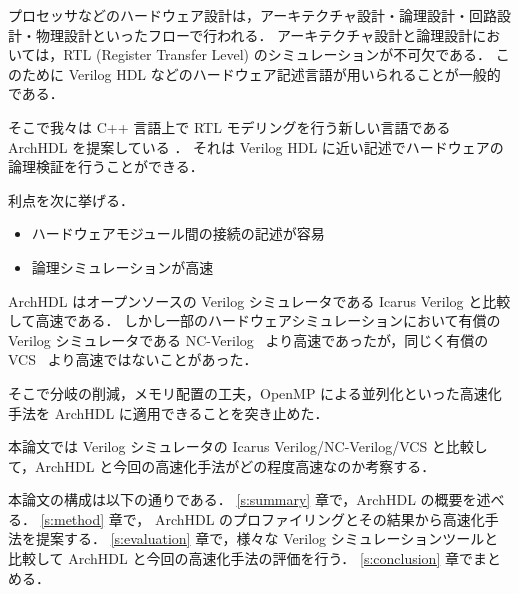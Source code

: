 プロセッサなどのハードウェア設計は，アーキテクチャ設計・論理設計・回路設計・物理設計といったフローで行われる．
アーキテクチャ設計と論理設計においては，RTL (Register Transfer Level) のシミュレーションが不可欠である．
このために Verilog HDL などのハードウェア記述言語が用いられることが一般的である．

そこで我々は C++ 言語上で RTL モデリングを行う新しい言語である ArchHDL を提案している \cite{satos:archhdl}．
それは Verilog HDL に近い記述でハードウェアの論理検証を行うことができる．

利点を次に挙げる．

\begin{itemize}
\itemsep1pt\parskip0pt
\item
  ハードウェアモジュール間の接続の記述が容易
\item
  論理シミュレーションが高速
\end{itemize}

ArchHDL はオープンソースの Verilog シミュレータである Icarus Verilog \cite{iverilog}と比較して高速である．
しかし一部のハードウェアシミュレーションにおいて有償の Verilog シミュレータである NC-Verilog~\cite{ncverilog} より高速であったが，同じく有償の VCS~\cite{vcs} より高速ではないことがあった．

そこで分岐の削減，メモリ配置の工夫，OpenMP による並列化といった高速化手法を ArchHDL に適用できることを突き止めた．

本論文では Verilog シミュレータの Icarus Verilog/NC-Verilog/VCS と比較して，ArchHDL と今回の高速化手法がどの程度高速なのか考察する．

本論文の構成は以下の通りである． \ref{s:summary} 章で，ArchHDL の概要を述べる．
\ref{s:method} 章で， ArchHDL のプロファイリングとその結果から高速化手法を提案する．
\ref{s:evaluation} 章で，様々な Verilog シミュレーションツールと比較して ArchHDL と今回の高速化手法の評価を行う．
\ref{s:conclusion} 章でまとめる．